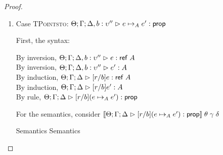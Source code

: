 \begin{proof}
\begin{enumerate}
  For the semantics, consider $\interp{\judgeA[\Theta; \Gamma; \Delta]{[r/b](p =_\omega q)}{\assert}}\;\theta\;\gamma\;\delta$
  \begin{eqnproof}
          {Semantics}
          {Induction}
          {Semantics}
  \end{eqnproof}

\item Case \textsc{TPointsto}: $\judgeA[\Theta; \Gamma; \Delta, b:\upsilon'']{e \pointsto_A e'}{\assert}$

  First, the syntax:
  \begin{tabbedproof}
    \oo By inversion, $\judgeA[\Theta; \Gamma; \Delta, b:\upsilon'']{e}{\reftype{A}}$ \\
    \oo By inversion, $\judgeA[\Theta; \Gamma; \Delta, b:\upsilon'']{e'}{A}$ \\
    \oo By induction, $\judgeA[\Theta; \Gamma; \Delta]{[r/b]e}{\reftype{A}}$ \\
    \oo By induction, $\judgeA[\Theta; \Gamma; \Delta]{[r/b]e'}{A}$ \\
    \oo By rule, $\judgeA[\Theta; \Gamma; \Delta]{[r/b](e \pointsto_A e')}{\assert}$
  \end{tabbedproof}

  For the semantics, consider $\interp{\judgeA[\Theta; \Gamma; \Delta]{[r/b](e \pointsto_A e')}{\assert}}\;\theta\;\gamma\;\delta$
  \begin{eqnproof}
          {Semantics}
          {Semantics}
  \end{eqnproof}


\end{enumerate}
\end{proof}
